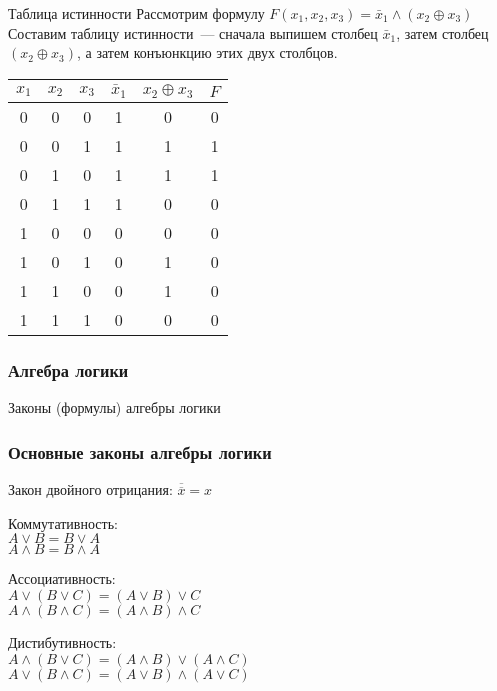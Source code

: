 \begin{frame}{Таблица истинности}
Рассмотрим формулу $F(x_1,x_2,x_3) = {\bar x}_1 \wedge (x_2\oplus x_3)$ 
Составим таблицу истинности~--- сначала выпишем столбец ${\bar x}_1$, затем столбец $(x_2\oplus x_3)$,
а затем конъюнкцию этих двух столбцов.

\medskip
\begin{tabular}{|c|c|c||c|c|c|}
  \hline
  $x_1$ & $x_2$ & $x_3$ & $\bar x_1$ & $x_2\oplus x_3$ & $F$ \\
  \hline
   0  &  0  & 0         & 1          &  0              & 0 \\
   0  &  0  & 1         & 1          &  1              & 1 \\
   0  &  1  & 0         & 1          &  1              & 1 \\
   0  &  1  & 1         & 1          &  0              & 0 \\
   1  &  0  & 0         & 0          &  0              & 0 \\
   1  &  0  & 1         & 0          &  1              & 0 \\
   1  &  1  & 0         & 0          &  1              & 0 \\
   1  &  1  & 1         & 0          &  0              & 0 \\
  \hline
\end{tabular}
\end{frame}

\begin{frame}
\frametitle{Алгебра логики}
\begin{center}

\Huge
Законы (формулы) алгебры логики
\end{center}


\end{frame}

\begin{frame}
\frametitle{Основные законы алгебры логики}
Закон двойного отрицания: $ \overline{\overline{x}}=x $  \pause

Коммутативность:\\
 $ A \vee B = B \vee A$\\
 $ A \wedge B = B \wedge A$\\ \pause

Ассоциативность:\\
 $ A \vee (B \vee C) = (A \vee B) \vee C$\\
 $ A \wedge (B \wedge C) = (A \wedge B) \wedge C$\\ \pause

Дистибутивность:\\
$ A \wedge (B \vee C) = (A \wedge B) \vee (A\wedge C)$\\ 
$ A \vee (B \wedge C) = (A \vee B) \wedge (A \vee C)$\\
 

\end{frame}

